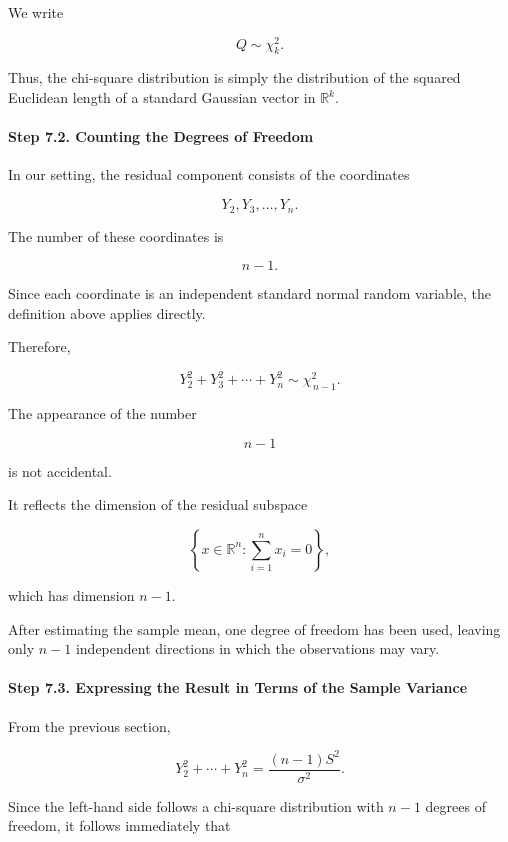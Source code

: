 \documentclass[11pt]{article}
\begin{document}
\begin{mdframed}[
		linewidth=0.8pt,
		roundcorner=6pt,
		backgroundcolor=gray!5,
		linecolor=gray!60,
		innertopmargin=10pt,
		innerbottommargin=10pt,
		innerleftmargin=10pt,
		innerrightmargin=10pt
		]
		We write
		
		\[
		\boxed{
			Q\sim\chi_k^2.
		}
		\]
		
		Thus, the chi-square distribution is simply the distribution of the squared
		Euclidean length of a standard Gaussian vector in $\mathbb R^k$.
		
		\vspace{0.3cm}
		
		\paragraph{Step 7.2. Counting the Degrees of Freedom}
		
		In our setting, the residual component consists of the coordinates
		
		\[
		Y_2,Y_3,\ldots,Y_n.
		\]
		
		The number of these coordinates is
		
		\[
		n-1.
		\]
		
		Since each coordinate is an independent standard normal random variable,
		the definition above applies directly.
		
		Therefore,
		
		\[
		\boxed{
			Y_2^2+Y_3^2+\cdots+Y_n^2
			\sim
			\chi_{\,n-1}^2.
		}
		\]
		
		The appearance of the number
		
		\[
		n-1
		\]
		
		is not accidental.
		
		It reflects the dimension of the residual subspace
		
		\[
		\left\{
		x\in\mathbb R^n:
		\sum_{i=1}^{n}x_i=0
		\right\},
		\]
		
		which has dimension $n-1$.
		
		After estimating the sample mean, one degree of freedom has been used,
		leaving only $n-1$ independent directions in which the observations may
		vary.
		
		\vspace{0.3cm}
		
		\paragraph{Step 7.3. Expressing the Result in Terms of the Sample Variance}
		
		From the previous section,
		
		\[
		Y_2^2+\cdots+Y_n^2
		=
		\frac{(n-1)S^2}{\sigma^2}.
		\]
		
		Since the left-hand side follows a chi-square distribution with
		$n-1$ degrees of freedom, it follows immediately that
		

\end{mdframed}
\end{document}
